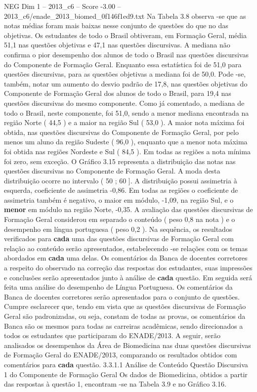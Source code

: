 \begin{textsample}{NEG Dim 1 – 2013\_c6 – Score -3.00 – 2013\_c6/enade\_2013\_biomed\_0f146f1ed9.txt}
Na Tabela 3.8 observa -se que as notas médias foram mais baixas nesse conjunto de questões do que no das objetivas.
Os estudantes de todo o Brasil obtiveram, em Formação Geral, média 51,1 nas questões objetivas e 47,1 nas questões discursivas.
A mediana não confirma o pior desempenho dos alunos de todo o Brasil nas questões discursivas do Componente de Formação Geral.
Enquanto essa estatística foi de 51,0 para questões discursivas, para as questões objetivas a mediana foi de 50,0.
Pode -se, também, notar um aumento do desvio padrão de 17,8, nas questões objetivas do Componente de Formação Geral dos alunos de todo o Brasil, para 19,4 nas questões discursivas do mesmo componente.
Como já comentado, a mediana de todo o Brasil, neste componente, foi 51,0, sendo a menor mediana encontrada na região Norte ( 44,5 ) e a maior na região Sul ( 53,0 ).
A maior nota máxima foi obtida, nas questões discursivas do Componente de Formação Geral, por pelo menos um aluno da região Sudeste ( 96,0 ), enquanto que a menor nota máxima foi obtida nas regiões Nordeste e Sul ( 84,5 ).
Em todas as regiões a nota mínima foi zero, sem exceção.
O Gráfico 3.15 representa a distribuição das notas nas questões discursivas no Componente de Formação Geral.
A moda desta distribuição ocorre no intervalo ( 50 ; 60 ].
A distribuição possui assimetria à esquerda, coeficiente de assimetria -0,86.
Em todas as regiões o coeficiente de assimetria também é negativo, o maior em módulo, -1,09, na região Sul, e o \textbf{menor} em módulo na região Norte, -0,35.
A avaliação das questões discursivas de Formação Geral considerou em separado o conteúdo ( peso 0,8 na nota ) e o desempenho em língua portuguesa ( peso 0,2 ).
Na sequência, os resultados verificados para \textbf{cada} uma das questões discursivas de Formação Geral com relação ao conteúdo serão apresentados, estabelecendo -se relações com os temas abordados em \textbf{cada} uma delas.
Os comentários da Banca de docentes corretores a respeito do observado na correção das respostas dos estudantes, suas impressões e conclusões serão apresentados junto à análise de \textbf{cada} questão.
Em seguida será feita uma análise do desempenho de Língua Portuguesa.
Os comentários da Banca de docentes corretores serão apresentados para o conjunto de questões.
Cumpre esclarecer que, tendo em vista que as questões discursivas de Formação Geral são padronizadas, ou seja, constam de todas as provas, os comentários da Banca são os mesmos para todas as carreiras acadêmicas, sendo direcionados a todos os estudantes que participaram do ENADE/2013.
A seguir, serão analisados os desempenhos da Área de Biomedicina nas duas questões discursivas de Formação Geral do ENADE/2013, comparando os resultados obtidos com comentários para \textbf{cada} questão. 3.3.1.1 Análise de Conteúdo Questão Discursiva 1 do Componente de Formação Geral Os dados de Biomedicina, obtidos a partir das respostas à questão 1, encontram -se na Tabela 3.9 e no Gráfico 3.16.

\end{textsample}
